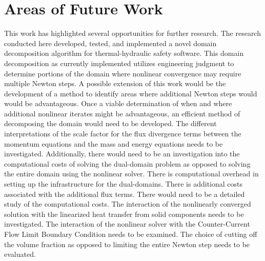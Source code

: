 \section{Areas of Future Work}
\label{sect:futureWork}
This work has highlighted several opportunities for further research.
The research conducted here developed, tested, and implemented a novel domain decomposition algorithm for thermal-hydraulic safety software.
This domain decomposition as currently implemented utilizes engineering judgment to determine portions of the domain where nonlinear convergence may require multiple Newton steps.
A possible extension of this work would be the development of a method to identify areas where additional Newton steps would would be advantageous.
Once a viable determination of when and where additional nonlinear iterates might be advantageous, an efficient method of decomposing the domain would need to be developed.
The different interpretations of the scale factor for the flux divergence terms between the momentum equations and the mass and energy equations needs to be investigated.
Additionally, there would need to be an investigation into the computational costs of solving the dual-domain problem as opposed to solving the entire domain using the nonlinear solver.
There is computational overhead in setting up the infrastructure for the dual-domains.
There is additional costs associated with the additional flux terms.
There would need to be a detailed study of the computational costs.
The interaction of the nonlinearly converged solution with the linearized heat transfer from solid components needs to be investigated.
The interaction of the nonlinear solver with the Counter-Current Flow Limit Boundary Condition needs to be examined.
The choice of cutting off the volume fraction as opposed to limiting the entire Newton step needs to be evaluated.
